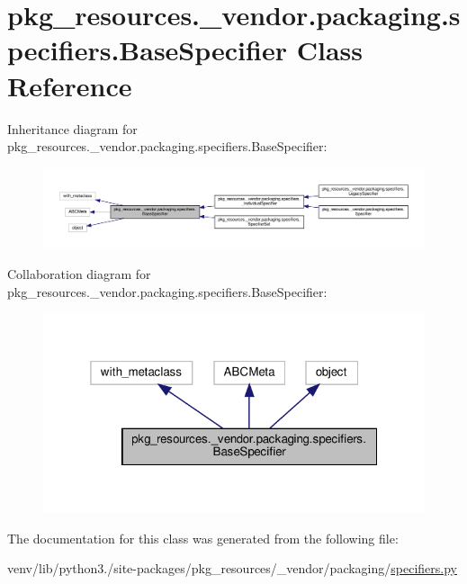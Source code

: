 \hypertarget{classpkg__resources_1_1__vendor_1_1packaging_1_1specifiers_1_1BaseSpecifier}{}\section{pkg\+\_\+resources.\+\_\+vendor.\+packaging.\+specifiers.\+Base\+Specifier Class Reference}
\label{classpkg__resources_1_1__vendor_1_1packaging_1_1specifiers_1_1BaseSpecifier}


Inheritance diagram for pkg\+\_\+resources.\+\_\+vendor.\+packaging.\+specifiers.\+Base\+Specifier\+:
\nopagebreak
\begin{figure}[H]
\begin{center}
\leavevmode
\includegraphics[width=350pt]{classpkg__resources_1_1__vendor_1_1packaging_1_1specifiers_1_1BaseSpecifier__inherit__graph}
\end{center}
\end{figure}


Collaboration diagram for pkg\+\_\+resources.\+\_\+vendor.\+packaging.\+specifiers.\+Base\+Specifier\+:
\nopagebreak
\begin{figure}[H]
\begin{center}
\leavevmode
\includegraphics[width=319pt]{classpkg__resources_1_1__vendor_1_1packaging_1_1specifiers_1_1BaseSpecifier__coll__graph}
\end{center}
\end{figure}


The documentation for this class was generated from the following file\+:\begin{DoxyCompactItemize}
\item 
venv/lib/python3./site-\/packages/pkg\+\_\+resources/\+\_\+vendor/packaging/\hyperlink{pkg__resources_2__vendor_2packaging_2specifiers_8py}{specifiers.\+py}\end{DoxyCompactItemize}
